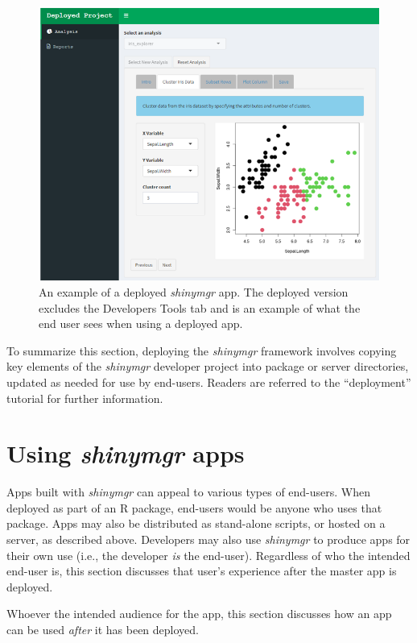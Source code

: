 \begin{figure}
\includegraphics[width=1\linewidth]{images/figure6} \caption{An example of a deployed \textit{shinymgr} app. The deployed version excludes the Developers Tools tab and is an example of what the end user sees when using a deployed app.}\label{fig:fig6}
\end{figure}

To summarize this section, deploying the \emph{shinymgr} framework involves copying key elements of the \emph{shinymgr} developer project into package or server directories, updated as needed for use by end-users. Readers are referred to the ``deployment'' tutorial for further information.

\section{\texorpdfstring{Using \emph{shinymgr} apps}{Using shinymgr apps}}\label{appUsing}

Apps built with \emph{shinymgr} can appeal to various types of end-users. When deployed as part of an R package, end-users would be anyone who uses that package. Apps may also be distributed as stand-alone scripts, or hosted on a server, as described above. Developers may also use \emph{shinymgr} to produce apps for their own use (i.e., the developer \emph{is} the end-user). Regardless of who the intended end-user is, this section discusses that user's experience after the master app is deployed.

Whoever the intended audience for the app, this section discusses how an app can be used \emph{after} it has been deployed.

